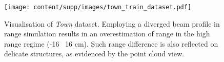 \begin{figure}[t]
\centering
\texttt{[image: content/supp/images/town\_train\_dataset.pdf]}

\caption{Visualisation of \textit{Town} dataset. Employing a diverged beam profile in range simulation results in an overestimation of range in the high range regime (-16 \bwr~16 cm). Such range difference is also reflected on delicate structures, as evidenced by the point cloud view.}
\label{fig:supp_town_dataset}

\end{figure}